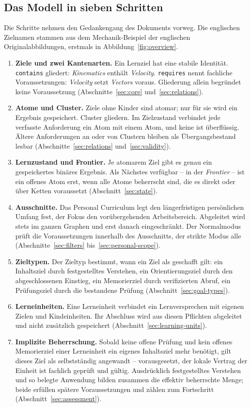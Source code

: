 \documentclass[11pt,a4paper,parskip=half,headings=normal,numbers=noenddot]{scrartcl}
\newcommand{\code}[1]{\texttt{#1}}
\begin{document}
\subsection*{Das Modell in sieben Schritten}
Die Schritte nehmen den Gedankengang des Dokuments vorweg. Die englischen
Zielnamen stammen aus dem Mechanik-Beispiel der englischen
Originalabbildungen, erstmals in Abbildung~\ref{fig:overview}.
\begin{enumerate}
\item \textbf{Ziele und zwei Kantenarten.} Ein Lernziel hat eine stabile
 Identität. \code{contains} gliedert: \emph{Kinematics} enthält
 \emph{Velocity}. \code{requires} nennt fachliche Voraussetzungen:
 \emph{Velocity} setzt \emph{Vectors} voraus. Gliederung allein begründet
 keine Voraussetzung (Abschnitte~\ref{sec:core} und~\ref{sec:relations}).
\item \textbf{Atome und Cluster.} Ziele ohne Kinder sind atomar; nur für sie
 wird ein Ergebnis gespeichert. Cluster gliedern. Im Zielzustand verbindet
 jede verfasste Anforderung ein Atom mit einem Atom, und keine ist
 überflüssig. Ältere Anforderungen an oder von Clustern bleiben als
 Übergangsbestand lesbar (Abschnitte~\ref{sec:relations}
 und~\ref{sec:validity}).
\item \textbf{Lernzustand und Frontier.} Je atomarem Ziel gibt es genau ein
 gespeichertes binäres Ergebnis. Als Nächstes verfügbar -- in der
 \emph{Frontier} -- ist ein offenes Atom erst, wenn alle Atome beherrscht
 sind, die es direkt oder über Ketten voraussetzt (Abschnitt~\ref{sec:state}).
\item \textbf{Ausschnitte.} Das Personal Curriculum legt den längerfristigen
 persönlichen Umfang fest, der Fokus den vorübergehenden Arbeitsbereich.
 Abgeleitet wird stets im ganzen Graphen und erst danach eingeschränkt. Der
 Normalmodus prüft die Voraussetzungen innerhalb des Ausschnitts, der
 strikte Modus alle (Abschnitte~\ref{sec:filters}
 bis~\ref{sec:personal-scope}).
\item \textbf{Zieltypen.} Der Zieltyp bestimmt, wann ein Ziel als geschafft
 gilt: ein Inhaltsziel durch festgestelltes Verstehen, ein
 Orientierungsziel durch den abgeschlossenen Einstieg, ein Memorierziel
 durch verifizierten Abruf, ein Prüfungsziel durch die bestandene Prüfung
 (Abschnitt~\ref{sec:goal-types}).
\item \textbf{Lerneinheiten.} Eine Lerneinheit verbindet ein Lernversprechen
 mit eigenen Zielen und Kindeinheiten. Ihr Abschluss wird aus diesen
 Pflichten abgeleitet und nicht zusätzlich gespeichert
 (Abschnitt~\ref{sec:learning-units}).
\item \textbf{Implizite Beherrschung.} Sobald keine offene Prüfung und kein
 offenes Memorierziel einer Lerneinheit ein eigenes Inhaltsziel mehr
 benötigt, gilt dieses Ziel als selbstständig angewandt -- vorausgesetzt,
 der lokale Vertrag der Einheit ist fachlich geprüft und gültig.
 Ausdrücklich festgestelltes Verstehen und so belegte Anwendung bilden
 zusammen die effektiv beherrschte Menge; beide erfüllen spätere
 Voraussetzungen und zählen zum Fortschritt
 (Abschnitt~\ref{sec:assessment}).
\end{enumerate}
\end{document}
